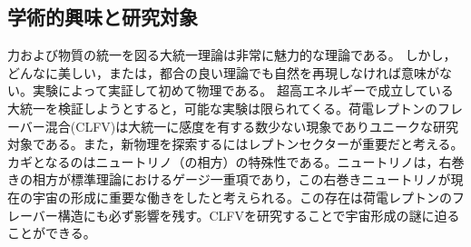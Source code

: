 \documentclass[11pt,a4paper,uplatex,dvipdfmx]{ujarticle} 		%
\newcommand{\研究課題名}{象の卵}
\newcommand{\研究機関名}{東京大学}
\newcommand{\研究代表者氏名}{内山雄祐}
\newcommand{\研究期間の最終元号年度}{6}  %
\newcommand*{\ee}{\mathrm{e^+e^-}}
\begin{document}
\noindent
\vspace{-2zw}
\subsection{学術的興味と研究対象}

%

力および物質の統一を図る大統一理論は非常に魅力的な理論である。%
しかし，どんなに美しい，または，都合の良い理論でも自然を再現しなければ意味がない。実験によって実証して初めて物理である。
超高エネルギーで成立している大統一を検証しようとすると，可能な実験は限られてくる。荷電レプトンのフレーバー混合(CLFV)は大統一に感度を有する数少ない現象でありユニークな研究対象である。また，新物理を探索するにはレプトンセクターが重要だと考える。カギとなるのはニュートリノ（の相方）の特殊性である。ニュートリノは，右巻きの相方が標準理論におけるゲージ一重項であり，この右巻きニュートリノが現在の宇宙の形成に重要な働きをしたと考えられる。この存在は荷電レプトンのフレーバー構造にも必ず影響を残す。CLFVを研究することで宇宙形成の謎に迫ることができる。
\end{document}
